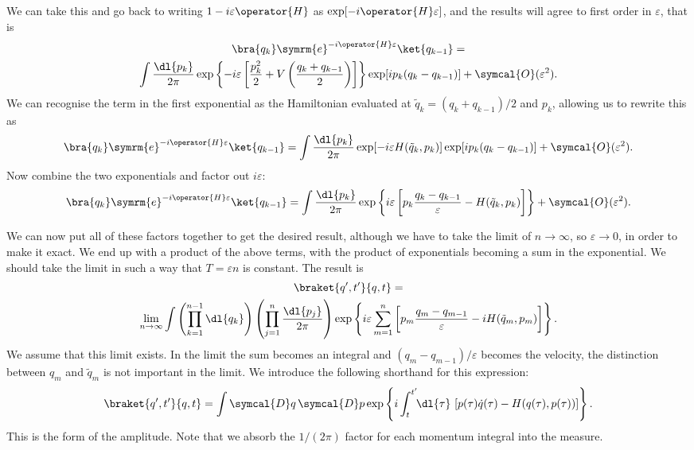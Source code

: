 \documentclass[fleqn]{NotesClass}
\newcommand{\e}{\symrm{e}}
\newcommand{\order}{\symcal{O}}
\newcommand{\DL}[1]{\symcal{D}#1}
\newcommand{\DD}[1]{\,\symcal{D}#1}
\begin{document}
    We can take this and go back to writing \(1 - i\varepsilon\operator{H}\) as \(\exp[-i\operator{H}\varepsilon]\), and the results will agree to first order in \(\varepsilon\), that is
    \begin{multline}
        \bra{q_k} \e^{-i\operator{H}\varepsilon} \ket{q_{k-1}} =\\
        \int \frac{\dl{p_k}}{2\pi} \exp\left\{ -i\varepsilon \left[ \frac{p_k^2}{2} + V\left( \frac{q_k + q_{k-1}}{2} \right) \right] \right\} \exp[ip_k(q_k - q_{k-1})] + \order(\varepsilon^2).
    \end{multline}
    We can recognise the term in the first exponential as the Hamiltonian evaluated at \(\tilde{q}_k = (q_k + q_{k-1})/2\) and \(p_k\), allowing us to rewrite this as
    \begin{equation}
        \bra{q_k} \e^{-i\operator{H}\varepsilon}\ket{q_{k-1}} = \int \frac{\dl{p_k}}{2\pi} \exp[-i\varepsilon H(\tilde{q}_k, p_k)]\exp[ip_k(q_k - q_{k-1})] + \order(\varepsilon^2).
    \end{equation}
    Now combine the two exponentials and factor out \(i\varepsilon\):
    \begin{equation}
        \bra{q_k} \e^{-i\operator{H}\varepsilon}\ket{q_{k-1}} = \int \frac{\dl{p_k}}{2\pi} \exp\left\{ i\varepsilon\left[ p_k\frac{q_k - q_{k-1}}{\varepsilon} - H(\tilde{q}_k, p_k) \right] \right\} + \order(\varepsilon^2).
    \end{equation}
    
    We can now put all of these factors together to get the desired result, although we have to take the limit of \(n \to \infty\), so \(\varepsilon \to 0\), in order to make it exact.
    We end up with a product of the above terms, with the product of exponentials becoming a sum in the exponential.
    We should take the limit in such a way that \(T = \varepsilon n\) is constant.
    The result is
    \begin{gather}
        \braket{q', t'}{q, t} =\\
        \lim_{n\to \infty} \int \left( \prod_{k=1}^{n-1} \dl{q_k} \right) \left( \prod_{j=1}^{n} \frac{\dl{p_j}}{2\pi} \right) \exp\left\{ i\varepsilon \sum_{m=1}^{n} \left[ p_m\frac{q_m - q_{m-1}}{\varepsilon} - iH(\tilde{q}_m, p_m) \right] \right\}.\notag
    \end{gather}
    We assume that this limit exists.
    In the limit the sum becomes an integral and \((q_m - q_{m-1})/\varepsilon\) becomes the velocity, the distinction between \(q_m\) and \(\tilde{q}_m\) is not important in the limit.
    We introduce the following shorthand for this expression:
    \begin{equation}
        \braket{q', t'}{q, t} = \int \DL{q} \DD{p} \exp\left\{ i\int_{t}^{t'} \!\! \dl{\tau} \, \left[ p(\tau)\dot{q}(\tau) - H(q(\tau), p(\tau)) \right] \right\}.
    \end{equation}
    This is the  form of the amplitude.
    Note that we absorb the \(1/(2\pi)\) factor for each momentum integral into the measure.
    
\end{document}

